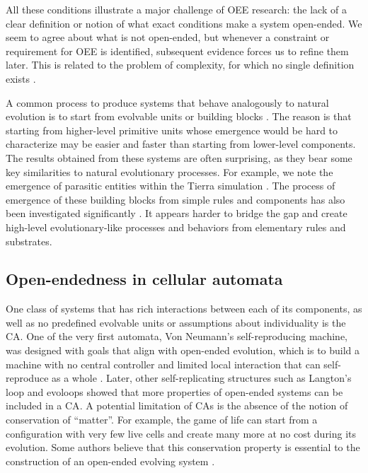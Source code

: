 All these conditions illustrate a major challenge of \ac{OEE} research: the lack
of a clear definition or notion of what exact conditions make a system
open-ended. We seem to agree about what is not open-ended, but whenever a
constraint or requirement for \ac{OEE} is identified, subsequent evidence forces
us to refine them later. This is related to the problem of complexity, for which
no single definition exists \parencite{johnsonSimplyComplexityClear2009}.

A common process to produce systems that behave analogously to natural evolution
is to start from evolvable units or building blocks
\parencite{rayApproachSynthesisLife1991, simsEvolvingVirtualCreatures1994,
  ofriaAvidaSoftwarePlatform2004, yaegerComputationalGeneticsPhysiology1994,
  channonImprovingStillPassing2003, spectorDivisionBlocksOpenended2007,
  sorosIdentifyingNecessaryConditions2014}. The reason is that starting from
higher-level primitive units whose emergence would be hard to characterize may
be easier and faster than starting from lower-level components. The results obtained
from these systems are often surprising, as they bear some key similarities
to natural evolutionary processes. For example, we note the emergence of
parasitic entities within the Tierra simulation
\parencite{rayApproachSynthesisLife1991}. The process of emergence of these
building blocks from simple rules and components has also been investigated
significantly \parencite{bagleySpontaneousEmergenceMetabolism1991,
  huttonEvolvableSelfReproducingCells2007, flammEvolutionMetabolicNetworks2010,
  sayamaSeekingOpenendedEvolution2011}. It appears harder to bridge the gap and
create high-level evolutionary-like processes and behaviors from elementary
rules and substrates.

\subsection{Open-endedness in cellular automata}
One class of systems that has rich interactions between each of its components, as
well as no predefined evolvable units or assumptions about individuality is the
\ac{CA}. One of the very first automata, Von Neumann's self-reproducing machine,
was designed with goals that align with open-ended evolution, which is to build
a machine with no central controller and limited local interaction that can
self-reproduce as a whole
\parencite{vonneumannTheorySelfreproducingAutomata1966,
  pesaventoImplementationNeumannSelfReproducing1995}. Later, other
self-replicating structures such as Langton's loop
\parencite{langtonSelfreproductionCellularAutomata1984} and evoloops
\parencite{sayamaNewStructurallyDissolvable1999,
  salzbergComplexGeneticEvolution2004} showed that more properties of open-ended
systems can be included in a \ac{CA}. A potential limitation of \acp{CA} is the
absence of the notion of conservation of ``matter''. For example, the game of life
can start from a configuration with very few live cells and create many more at
no cost during its evolution. Some authors believe that this conservation
property is essential to the construction of an open-ended evolving system
\parencite{taylorChapterCreativityEvolution2002}.


